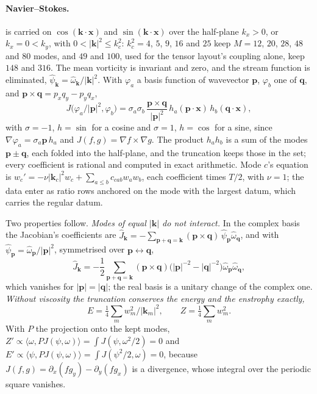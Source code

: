 \paragraph{Navier--Stokes.}  is carried on $\cos(\mathbf k\cdot\mathbf x)$ and $\sin(\mathbf k\cdot\mathbf x)$ over the half-plane $k_x>0$, or $k_x=0<k_y$, with $0<|\mathbf k|^2\le k_c^2$: $k_c^2=4$, $5$, $9$, $16$ and $25$ keep $M=12$, $20$, $28$, $48$ and $80$ modes, and $49$ and $100$, used for the tensor layout's coupling alone, keep $148$ and $316$. The mean vorticity is invariant and zero, and the stream function is eliminated, $\hat\psi_{\mathbf k}=\hat\omega_{\mathbf k}/|\mathbf k|^2$. With $\varphi_a$ a basis function of wavevector $\mathbf p$, $\varphi_b$ one of $\mathbf q$, and $\mathbf p\times\mathbf q=p_xq_y-p_yq_x$,
\begin{equation}
    J\bigl(\varphi_a/|\mathbf p|^2,\varphi_b\bigr)=\sigma_a\sigma_b\,\frac{\mathbf p\times\mathbf q}{|\mathbf p|^2}\,h_a(\mathbf p\cdot\mathbf x)\,h_b(\mathbf q\cdot\mathbf x),
\end{equation}
with $\sigma=-1$, $h=\sin$ for a cosine and $\sigma=1$, $h=\cos$ for a sine, since $\nabla\varphi_a=\sigma_a\mathbf p\,h_a$ and $J(f,g)=\nabla f\times\nabla g$. The product $h_ah_b$ is a sum of the modes $\mathbf p\pm\mathbf q$, each folded into the half-plane, and the truncation keeps those in the set; every coefficient is rational and computed in exact arithmetic. Mode $c$'s equation is $w_c'=-\nu|\mathbf k_c|^2w_c+\sum_{a\le b}c_{cab}w_aw_b$, each coefficient times $T/2$, with $\nu=1$; the data enter as ratio rows anchored on the mode with the largest datum, which carries the regular datum.

Two properties follow. \emph{Modes of equal $|\mathbf k|$ do not interact.} In the complex basis the Jacobian's coefficients are $\widehat J_{\mathbf k}=-\sum_{\mathbf p+\mathbf q=\mathbf k}(\mathbf p\times\mathbf q)\,\hat\psi_{\mathbf p}\hat\omega_{\mathbf q}$, and with $\hat\psi_{\mathbf p}=\hat\omega_{\mathbf p}/|\mathbf p|^2$, symmetrised over $\mathbf p\leftrightarrow\mathbf q$,
\begin{equation}
    \widehat J_{\mathbf k}=-\frac12\sum_{\mathbf p+\mathbf q=\mathbf k}(\mathbf p\times\mathbf q)\bigl(|\mathbf p|^{-2}-|\mathbf q|^{-2}\bigr)\hat\omega_{\mathbf p}\hat\omega_{\mathbf q},
\end{equation}
which vanishes for $|\mathbf p|=|\mathbf q|$; the real basis is a unitary change of the complex one. \emph{Without viscosity the truncation conserves the energy and the enstrophy exactly,}
\begin{equation}
    E=\tfrac14\textstyle\sum_mw_m^2/|\mathbf k_m|^2,
    \qquad
    Z=\tfrac14\textstyle\sum_mw_m^2 .
\end{equation}
With $P$ the projection onto the kept modes, $Z'\propto\langle\omega,PJ(\psi,\omega)\rangle=\int J(\psi,\omega^2/2)=0$ and $E'\propto\langle\psi,PJ(\psi,\omega)\rangle=\int J(\psi^2/2,\omega)=0$, because $J(f,g)=\partial_x(fg_y)-\partial_y(fg_x)$ is a divergence, whose integral over the periodic square vanishes.

